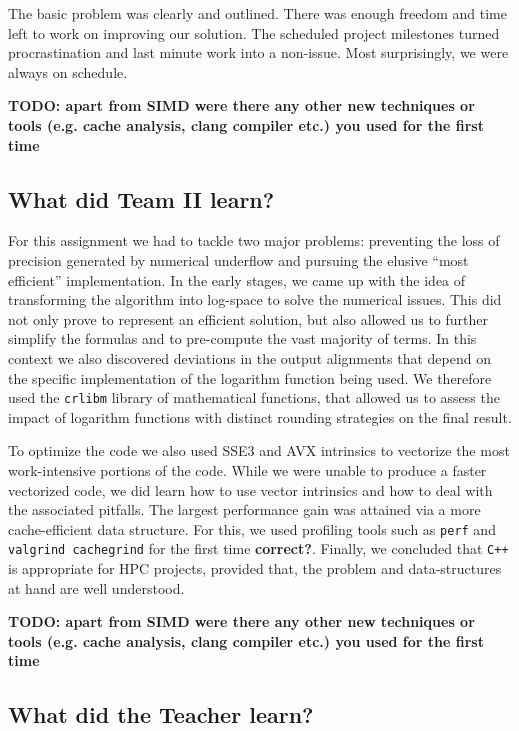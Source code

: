\documentclass[runningheads,a4paper]{llncs}
\begin{document}
The basic problem was clearly and outlined. There was enough freedom and time left 
to work on improving our solution. The scheduled project milestones 
turned procrastination and last minute work into a non-issue. 
Most surprisingly, we were always on schedule.

{\bf TODO: apart from SIMD were there any other new techniques or tools (e.g. cache analysis, clang compiler etc.) you used for the first time}

\subsection{What did Team II learn?}
For this assignment we had to tackle two major problems: preventing the loss of precision generated by numerical underflow and 
pursuing the elusive ``most efficient'' implementation. 
In the early stages, we came up with the idea of transforming the algorithm into log-space to solve the numerical issues. 
This did not only prove to represent an efficient solution, but also allowed us to further simplify the formulas and to pre-compute the vast majority of terms. 
In this context we also discovered deviations in the output alignments
that depend on the specific implementation of the logarithm function being used. 
We therefore used the \texttt{crlibm} library of mathematical functions, that allowed us to assess the impact of logarithm functions with distinct rounding strategies
on the final result.

To optimize the code we also used SSE3 and AVX intrinsics to vectorize the most work-intensive portions of the code. 
While we were unable to produce a faster vectorized code, we did learn how to use vector intrinsics and how to deal with the associated pitfalls. 
The largest performance gain was attained via a more cache-efficient data structure. 
For this, we used profiling tools such as \texttt{perf} and \texttt{valgrind cachegrind} for the first time {\bf correct?}. 
Finally,  we concluded that \verb|C++| is appropriate for HPC projects, provided that, the problem and data-structures at hand are well understood.

{\bf TODO: apart from SIMD were there any other new techniques or tools (e.g. cache analysis, clang compiler etc.) you used for the first time}

\subsection{What did the Teacher learn?}
\end{document}
